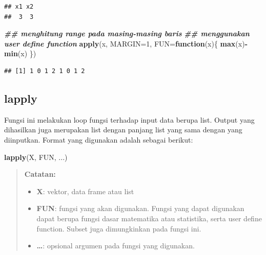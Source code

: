 \documentclass[
]{book}
\newenvironment{Shaded}{\begin{snugshade}}{\end{snugshade}}
\newcommand{\AttributeTok}[1]{\textcolor[rgb]{0.13,0.29,0.53}{#1}}
\newcommand{\ControlFlowTok}[1]{\textcolor[rgb]{0.13,0.29,0.53}{\textbf{#1}}}
\newcommand{\DecValTok}[1]{\textcolor[rgb]{0.00,0.00,0.81}{#1}}
\newcommand{\DocumentationTok}[1]{\textcolor[rgb]{0.56,0.35,0.01}{\textbf{\textit{#1}}}}
\newcommand{\FunctionTok}[1]{\textcolor[rgb]{0.13,0.29,0.53}{\textbf{#1}}}
\newcommand{\NormalTok}[1]{#1}
\newcommand{\SpecialCharTok}[1]{\textcolor[rgb]{0.81,0.36,0.00}{\textbf{#1}}}
\providecommand{\tightlist}{%
  \setlength{\itemsep}{0pt}\setlength{\parskip}{0pt}}
\theoremstyle{definition}
\theoremstyle{definition}
\theoremstyle{definition}
\theoremstyle{definition}
\theoremstyle{remark}
\begin{document}
\begin{verbatim}
## x1 x2 
##  3  3
\end{verbatim}

\begin{Shaded}
\begin{Highlighting}[]
\DocumentationTok{\#\# menghitung range pada masing{-}masing baris}
\DocumentationTok{\#\# menggunakan user define function}
\FunctionTok{apply}\NormalTok{(x, }\AttributeTok{MARGIN=}\DecValTok{1}\NormalTok{,}
      \AttributeTok{FUN=}\ControlFlowTok{function}\NormalTok{(x)\{}
        \FunctionTok{max}\NormalTok{(x)}\SpecialCharTok{{-}}\FunctionTok{min}\NormalTok{(x)}
\NormalTok{      \})}
\end{Highlighting}
\end{Shaded}

\begin{verbatim}
## [1] 1 0 1 2 1 0 1 2
\end{verbatim}

\hypertarget{lapply}{%
\subsection{lapply}\label{lapply}}

Fungsi ini melakukan loop fungsi terhadap input data berupa list. Output yang dihasilkan juga merupakan list dengan panjang list yang sama dengan yang diinputkan. Format yang digunakan adalah sebagai berikut:

\begin{Shaded}
\begin{Highlighting}[]
\FunctionTok{lapply}\NormalTok{(X, FUN, ...)}
\end{Highlighting}
\end{Shaded}

\begin{quote}
\textbf{Catatan:}

\begin{itemize}
\tightlist
\item
  \textbf{X}: vektor, data frame atau list
\item
  \textbf{FUN}: fungsi yang akan digunakan. Fungsi yang dapat digunakan dapat berupa fungsi dasar matematika atau statistika, serta user define function. Subset juga dimungkinkan pada fungsi ini.
\item
  \textbf{\ldots{}}: opsional argumen pada fungsi yang digunakan.
\end{itemize}
\end{quote}
\end{document}
